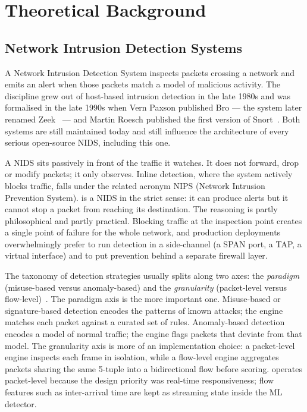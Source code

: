 \chapter{Theoretical Background}
\label{chap:background}

\section{Network Intrusion Detection Systems}
\label{sec:bg-nids}

A Network Intrusion Detection System inspects packets crossing a
network and emits an alert when those packets match a model of
malicious activity. The discipline grew out of host-based intrusion
detection in the late 1980s and was formalised in the late 1990s when
Vern Paxson published Bro --- the system later renamed
Zeek~\cite{paxson1999bro} --- and Martin Roesch published the first
version of Snort~\cite{roesch1999snort}. Both systems are still
maintained today and still influence the architecture of every
serious open-source NIDS, including this one.

A NIDS sits passively in front of the traffic it watches. It does not
forward, drop or modify packets; it only observes. Inline detection,
where the system actively blocks traffic, falls under the related
acronym NIPS (Network Intrusion Prevention System). \nidsname{} is a
NIDS in the strict sense: it can produce alerts but it cannot stop a
packet from reaching its destination. The reasoning is partly
philosophical and partly practical. Blocking traffic at the inspection
point creates a single point of failure for the whole network, and
production deployments overwhelmingly prefer to run detection in a
side-channel (a SPAN port, a TAP, a virtual interface) and to put
prevention behind a separate firewall layer.

The taxonomy of detection strategies usually splits along two axes:
the \emph{paradigm} (misuse-based versus anomaly-based) and the
\emph{granularity} (packet-level versus flow-level)~\cite{garcia2009anomaly}.
The paradigm axis is the more important one. Misuse-based or
signature-based detection encodes the patterns of known attacks; the
engine matches each packet against a curated set of rules. Anomaly-based
detection encodes a model of normal traffic; the engine flags packets
that deviate from that model. The granularity axis is more of an
implementation choice: a packet-level engine inspects each frame in
isolation, while a flow-level engine aggregates packets sharing the
same 5-tuple into a bidirectional flow before scoring. \nidsname{}
operates packet-level because the design priority was real-time
responsiveness; flow features such as inter-arrival time are kept as
streaming state inside the ML detector.

